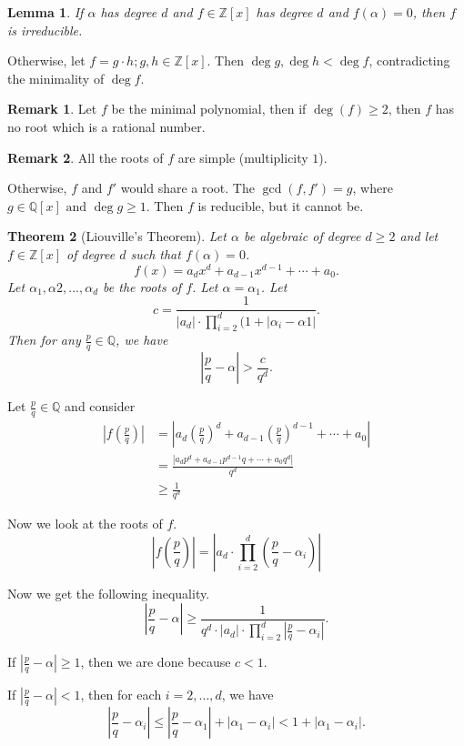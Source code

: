 \documentclass[11pt]{article}
\newtheorem{thm}{Theorem}[section]
\newtheorem{lemma}[thm]{Lemma}
\theoremstyle{definition}
\newtheorem{remark}{Remark}[section]
\newcommand{\et}[0]{\text{ and }}
\newcommand{\abs}[1]{\left\lvert#1\right\rvert} %
\newcommand{\QQ}{\mathbb{Q}}
\newcommand{\ZZ}{\mathbb{Z}}
\begin{document}
\begin{lemma}
	If $\alpha$ has degree $d$ and $f\in\ZZ[x]$ has degree $d$ and $f(\alpha)=0$,
	then $f$ is irreducible.
\end{lemma}
\proof
	Otherwise, let $f = g\cdot h; g,h\in\ZZ[x]$. 
	Then $\deg g, \deg h < \deg f$, contradicting the minimality of $\deg f$.
\qedhere

\begin{remark}
	Let $f$ be the minimal polynomial, then if $\deg(f) \ge 2$, then $f$ has no root which is a rational number. 
\end{remark}

\begin{remark}
	All the roots of $f$ are simple (multiplicity $1$). 
\end{remark}
\proof
	Otherwise, $f$ and $f'$ would share a root.
	The $\gcd(f, f') = g$, where $g\in\QQ[x] \et \deg g \ge 1$. 
	Then $f$ is reducible, but it cannot be.
\qedhere

\begin{thm}[Liouville's Theorem]
	Let $\alpha$ be algebraic of degree $d\ge2$ and let $f\in\ZZ[x]$ of degree $d$ such that $f(\alpha)=0$.
	$$ f(x) = a_d x^d + a_{d-1} x^{d-1} + \cdots + a_0 . $$
	Let $\alpha_1, \alpha2, ..., \alpha_d$ be the roots of $f$.
	Let $\alpha = \alpha_1$.
	Let 
	$$ c = \frac1{\abs{a_d} \cdot \prod_{i=2}^{d}(1+\abs{\alpha_i - \alpha1}} . $$
	Then for any $\frac{p}{q} \in \QQ$, we have 
	$$ \abs{\frac{p}{q} - \alpha} > \frac{c}{q^d} . $$
\end{thm}
\proof
	Let $\frac{p}{q}\in\QQ$ and consider
	\begin{align*} 
		\abs{ f(\frac{p}{q}) } &= \abs{ a_d \left(\frac{p}{q}\right)^d + a_{d-1} \left(\frac{p}{q}\right)^{d-1} + \cdots + a_0 } \\
		&= \frac{\abs{ a_d p^d + a_{d-1} p^{d-1} q + \cdots + a_0 q^d }}{q^d} \\
		&\ge \frac1{q^d}
	\end{align*}

	Now we look at the roots of $f$. 
	$$ \abs{ f(\frac{p}{q}) } = \abs{ a_d \cdot \prod_{i=2}^{d}(\frac{p}{q} - \alpha_i) } $$

	Now we get the following inequality.
	$$ \abs{\frac{p}{q} - \alpha} \ge \frac1{q^d \cdot \abs{a_d} \cdot \prod_{i=2}^{d} \abs{\frac{p}{q} - \alpha_i}} . $$
	
	If $\abs{\frac{p}{q} - \alpha} \ge 1$, then we are done because $c < 1$.

	If $\abs{\frac{p}{q} - \alpha} < 1$, then for each $i = 2,...,d$, we have 
	$$ \abs{\frac{p}{q} - \alpha_i} \le \abs{\frac{p}{q} - \alpha_1} + \abs{\alpha_1 - \alpha_i} < 1 + \abs{\alpha_1 - \alpha_i} . $$ 
\end{document}
